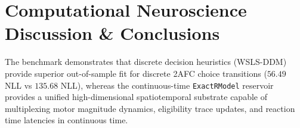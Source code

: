 \documentclass[11pt,a4paper]{article}
\begin{document}
\section{Computational Neuroscience Discussion \& Conclusions}

The benchmark demonstrates that discrete decision heuristics (WSLS-DDM) provide superior out-of-sample fit for discrete 2AFC choice transitions ($56.49$ NLL vs $135.68$ NLL), whereas the continuous-time \texttt{ExactRModel} reservoir provides a unified high-dimensional spatiotemporal substrate capable of multiplexing motor magnitude dynamics, eligibility trace updates, and reaction time latencies in continuous time.
\end{document}
